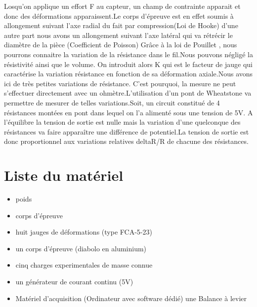 \documentclass[11pt,a4paper]{report}
\begin{document}
Losqu'on applique un effort F au capteur, un champ de contrainte apparait et donc des déformations apparaissent.Le corps d'épreuve est en effet soumis à allongement suivant l'axe radial du fait par compression(Loi de Hooke) d'une autre part nous avons un allongement suivant l'axe latéral qui va rétrécir le diamètre de la pièce (Coefficient de Poisson) Grâce à la loi de Pouillet , nous pourrons connaitre la variation de la résistance dans le fil.Nous pouvons négligé la résistivité ainsi que le volume. On introduit alors K qui est le facteur de jauge qui caractérise la variation résistance en fonction de sa déformation axiale.Nous avons ici de très petites variations de résistance.
C'est pourquoi, la mesure ne peut s'effectuer directement avec un ohmètre.L'utilisation d'un pont de Wheatstone va permettre de mesurer de telles variations.Soit, un circuit constitué de 4 résistances montées en pont dans lequel on l'a alimenté sous une tension de 5V. A l'équilibre la tension de sortie est nulle mais la variation d'une quelconque des résistances va faire apparaître une différence de potentiel.La tension de sortie est donc proportionnel aux variations relatives deltaR/R de chacune des résistances. 

\section*{Liste du matériel}
\begin{itemize}
\item poids 
\item corps d'épreuve
\item huit jauges de déformations (type FCA-5-23)
\item un corps d'épreuve (diabolo en aluminium)
\item cinq charges experimentales de masse connue
\item un générateur de courant continu (5V)
\item Matériel d'acquisition (Ordinateur avec software dédié)   une Balance à levier
\end{itemize}	
\end{document}
